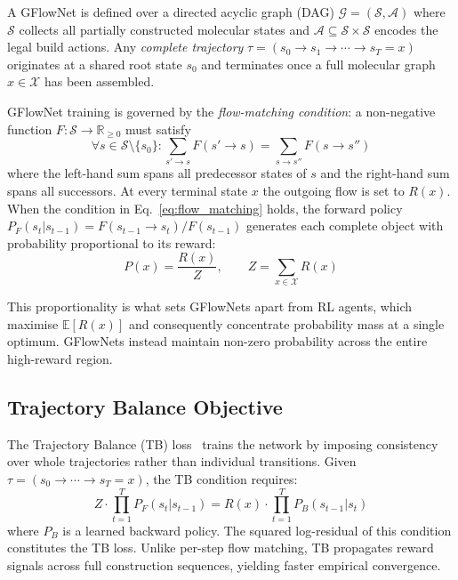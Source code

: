 \documentclass[twocolumn,10pt]{article}
\begin{document}
A GFlowNet is defined over a directed acyclic graph (DAG) $\mathcal{G} = (\mathcal{S}, \mathcal{A})$
where $\mathcal{S}$ collects all partially constructed molecular states and
$\mathcal{A} \subseteq \mathcal{S} \times \mathcal{S}$ encodes the legal build actions.
Any \textit{complete trajectory} $\tau = (s_0 \to s_1 \to \cdots \to s_T = x)$ originates at
a shared root state $s_0$ and terminates once a full molecular graph $x \in \mathcal{X}$ has
been assembled.

GFlowNet training is governed by the \textit{flow-matching condition}: a non-negative function
$F: \mathcal{S} \to \mathbb{R}_{\geq 0}$ must satisfy
\begin{equation}
\forall s \in \mathcal{S} \setminus \{s_0\}: \sum_{s' \to s} F(s' \to s) = \sum_{s \to s''} F(s \to s'')
\label{eq:flow_matching}
\end{equation}
where the left-hand sum spans all predecessor states of $s$ and the right-hand sum spans all
successors. At every terminal state $x$ the outgoing flow is set to $R(x)$. When the condition
in Eq.~\ref{eq:flow_matching} holds, the forward policy
$P_F(s_t | s_{t-1}) = F(s_{t-1} \to s_t) / F(s_{t-1})$ generates each complete object with
probability proportional to its reward:
\begin{equation}
P(x) = \frac{R(x)}{Z}, \qquad Z = \sum_{x \in \mathcal{X}} R(x)
\label{eq:gfn_sampling}
\end{equation}

This proportionality is what sets GFlowNets apart from RL agents, which maximise
$\mathbb{E}[R(x)]$ and consequently concentrate probability mass at a single optimum.
GFlowNets instead maintain non-zero probability across the entire high-reward region.

\subsection{Trajectory Balance Objective}

The Trajectory Balance (TB) loss~\cite{malkin2022trajectory} trains the network by imposing
consistency over whole trajectories rather than individual transitions. Given
$\tau = (s_0 \to \cdots \to s_T = x)$, the TB condition requires:
\begin{equation}
Z \cdot \prod_{t=1}^{T} P_F(s_t | s_{t-1}) = R(x) \cdot \prod_{t=1}^{T} P_B(s_{t-1} | s_t)
\label{eq:tb_condition}
\end{equation}
where $P_B$ is a learned backward policy. The squared log-residual of this condition
constitutes the TB loss. Unlike per-step flow matching, TB propagates reward signals across
full construction sequences, yielding faster empirical convergence.
\end{document}
